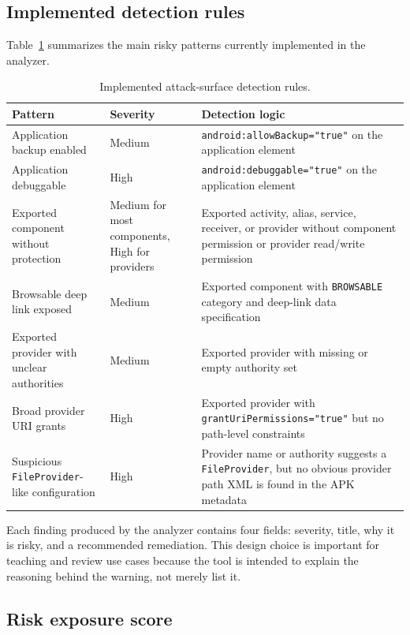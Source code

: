 \documentclass[preprint,12pt,a4paper]{elsarticle}
\begin{document}
\subsection{Implemented detection rules}

Table~\ref{tab:rules} summarizes the main risky patterns currently implemented in the analyzer.

\begin{table}[H]
\centering
\small
\begin{tabularx}{\textwidth}{|p{2.9cm}|p{2cm}|X|}
\hline
\textbf{Pattern} & \textbf{Severity} & \textbf{Detection logic} \\
\hline
Application backup enabled & Medium & \texttt{android:allowBackup="true"} on the application element \\
\hline
Application debuggable & High & \texttt{android:debuggable="true"} on the application element \\
\hline
Exported component without protection & Medium for most components, High for providers & Exported activity, alias, service, receiver, or provider without component permission or provider read/write permission \\
\hline
Browsable deep link exposed & Medium & Exported component with \texttt{BROWSABLE} category and deep-link data specification \\
\hline
Exported provider with unclear authorities & Medium & Exported provider with missing or empty authority set \\
\hline
Broad provider URI grants & High & Exported provider with \texttt{grantUriPermissions="true"} but no path-level constraints \\
\hline
Suspicious \texttt{FileProvider}-like configuration & High & Provider name or authority suggests a \texttt{FileProvider}, but no obvious provider path XML is found in the APK metadata \\
\hline
\end{tabularx}
\caption{Implemented attack-surface detection rules.}
\label{tab:rules}
\end{table}

Each finding produced by the analyzer contains four fields: severity, title, why it is risky, and a recommended remediation. This design choice is important for teaching and review use cases because the tool is intended to explain the reasoning behind the warning, not merely list it.

\subsection{Risk exposure score}
\end{document}
